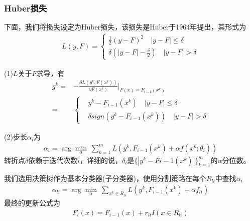           \subsubsection{Huber损失}
              \par
              下面，我们将损失设定为Huber损失，该损失是Huber于1964年提出，其形式为
              \begin{align*}
              L(y,F) = \left\{
              \begin{aligned}
              \frac{1}{2}(y-F)^2\quad |y-F| \leqslant \delta\\
              \delta (|y-F|-\frac{\delta}{2}) \quad |y-F| > \delta
              \end{aligned}
              \right.
              \end{align*}
              \par
              (1)$L$关于$F$求导，有
              \begin{align*}
              g^k =& -\frac{\partial L(y^k,F(x^k))}{\partial F(x^k)} \bigg|_{F(x) = F_{i-1}(x^k)}\\
              =& \left\{
              \begin{aligned}
              & y^k - F_{i-1}(x^k) \quad |y-F| \leqslant \delta\\
              & \delta sign (y^k - F_{i-1}(x^k)) \quad |y-F| >\delta
              \end{aligned}
              \right.
              \end{align*}
              \par
              (2)步长$\alpha_i$为
              \begin{align*}
              \alpha_i = \arg\min_\alpha \ \sum_{k=1}^m L(y^k,F_{i-1}(x^k)+\alpha f(x^k;\theta_i))
              \end{align*}
              转折点$\delta$依赖于迭代次数$i$，详细的说，$\delta_i$是$\{|y^k - F{i-1}(x^k)|\}_{k=1}^m$的$\alpha$分位数。
              \par
              我们选用决策树作为基本分类器(子分类器)，使用分割策略在每个$R_{li}$中查找$\alpha_i$
              \begin{align*}
              \alpha_{li} = \arg\min_\alpha \ \sum_{x^k\in R_{li}} L(y^k,F_{i-1}(x^k)+\alpha f_{li})
              \end{align*}
              最终的更新公式为
              \begin{align*}
              F_i(x) = F_{i-1}(x)+r_{li}I(x\in R_{li})
              \end{align*}
